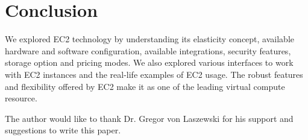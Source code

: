 \section{Conclusion}
We explored EC2 technology by understanding its elasticity concept, available hardware and software configuration, available integrations, security features, storage option and pricing modes. We also explored various interfaces to work with EC2 instances and the real-life examples of EC2 usage. The robust features and flexibility offered by EC2 make it as one of the leading virtual compute resource.

\begin{acks}

  The author would like to thank Dr. Gregor von Laszewski for his
  support and suggestions to write this paper.

\end{acks}


 
